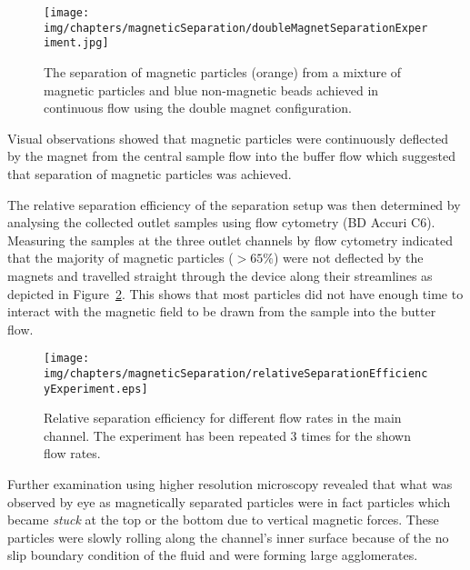 \begin{figure}[htb]
   \centering
   \texttt{[image: img/chapters/magneticSeparation/doubleMagnetSeparationExperiment.jpg]}
   \caption[Double magnet particle separation experiment in continuous flow]{The separation of magnetic particles (orange) from a mixture of magnetic particles and blue non-magnetic beads achieved in continuous flow using the double magnet configuration.}
   \label{fig:doubleMagnetSeparationExperiment}
\end{figure}

Visual observations showed that magnetic particles were continuously deflected by the magnet from the central sample flow into the buffer flow which suggested that separation of magnetic particles was achieved. 

The relative separation efficiency of the separation setup was then determined by analysing the collected outlet samples using flow cytometry (BD Accuri C6). Measuring the samples at the three outlet channels by flow cytometry indicated that the majority of magnetic particles ($>65\%$) were not deflected by the magnets and travelled straight through the device along their streamlines as depicted in Figure~\ref{fig:relativeSeparationEfficiencyContineousExperimentDoubleConfiguration}. This shows that most particles did not have enough time to interact with the magnetic field to be drawn from the sample into the butter flow.

\begin{figure}[htb]
   \centering
   \texttt{[image: img/chapters/magneticSeparation/relativeSeparationEfficiencyExperiment.eps]}
   \caption[Particle separation efficiency of the double magnet configuration in continuous flow]{Relative separation efficiency for different flow rates in the main channel. The experiment has been repeated $3$ times for the shown flow rates.}
   \label{fig:relativeSeparationEfficiencyContineousExperimentDoubleConfiguration}
\end{figure}

Further examination using higher resolution microscopy revealed that what was observed by eye as magnetically separated particles were in fact particles which became \textit{stuck} at the top or the bottom due to vertical magnetic forces. These particles were slowly rolling along the channel's inner surface because of the no slip boundary condition of the fluid and were forming large agglomerates.



